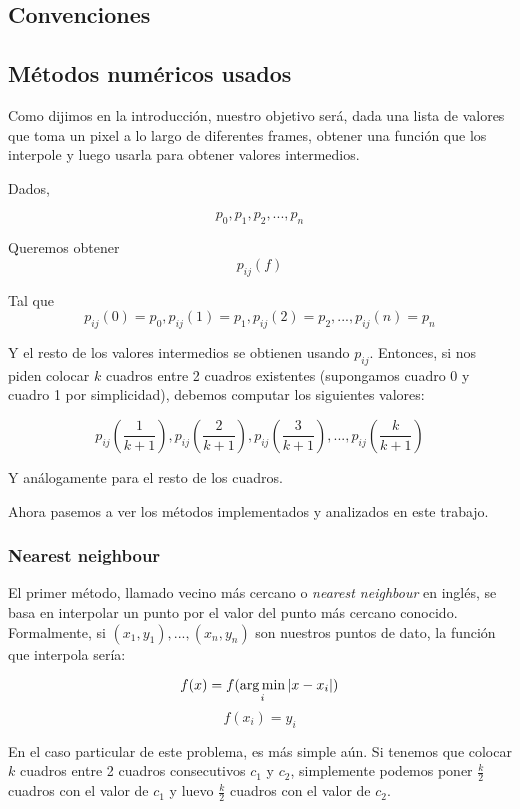 \subsection{Convenciones}

\subsection{Métodos numéricos usados}

Como dijimos en la introducción, nuestro objetivo será, dada una lista de valores que toma un pixel a lo largo de diferentes frames, obtener una función que los interpole y luego usarla para obtener valores intermedios.

Dados,

\[ p_0, p_1, p_2, ..., p_n \]

Queremos obtener \[p_{ij}(f) \]

Tal que \[p_{ij}(0) = p_0, p_{ij}(1) = p_1, p_{ij}(2) = p_2, ..., p_{ij}(n) = p_n\]

Y el resto de los valores intermedios se obtienen usando $p_{ij}$. Entonces, si nos piden colocar $k$ cuadros entre 2 cuadros existentes (supongamos cuadro 0 y cuadro 1 por simplicidad), debemos computar los siguientes valores:

\[p_{ij}\left(\frac1{k+1}\right), p_{ij}\left(\frac2{k+1}\right), p_{ij}\left(\frac3{k+1}\right), ..., p_{ij}\left(\frac{k}{k+1}\right)\]

Y análogamente para el resto de los cuadros.

Ahora pasemos a ver los métodos implementados y analizados en este trabajo.


\subsubsection{Nearest neighbour}

El primer método, llamado vecino más cercano o \emph{nearest neighbour} en inglés, se basa en interpolar un punto por el valor del punto más cercano conocido. Formalmente, si $(x_1, y_1), ..., (x_n, y_n)$ son nuestros puntos de dato, la función que interpola sería:

\[ f(x) = f(\operatorname*{arg\,min}_{i} |x - x_i|) \]
\[ f(x_i) = y_i \]

En el caso particular de este problema, es más simple aún. Si tenemos que colocar $k$ cuadros entre 2 cuadros consecutivos $c_1$ y $c_2$, simplemente podemos poner $\frac{k}{2}$ cuadros con el valor de $c_1$ y luevo $\frac{k}{2}$ cuadros con el valor de $c_2$.


